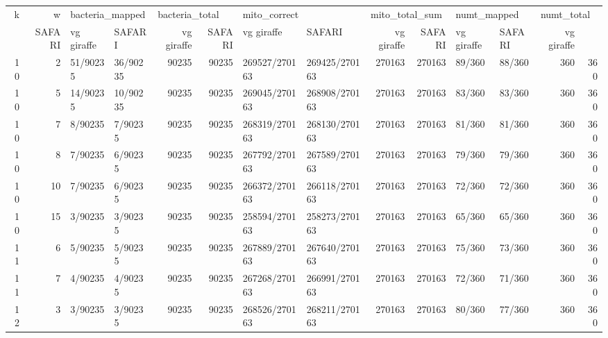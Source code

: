 \begin{tabular}{rrllrrllrrllrr}
\toprule
   k &    w & \multicolumn{2}{l}{bacteria_mapped} & \multicolumn{2}{l}{bacteria_total} & \multicolumn{2}{l}{mito_correct} & \multicolumn{2}{l}{mito_total_sum} & \multicolumn{2}{l}{numt_mapped} & \multicolumn{2}{l}{numt_total} \\
     &          SAFARI & vg giraffe &         SAFARI & vg giraffe &        SAFARI &    vg giraffe &         SAFARI & vg giraffe &      SAFARI & vg giraffe &     SAFARI & vg giraffe \\
\midrule
10 &  2 &        51/90235 &   36/90235 &          90235 &      90235 & 269527/270163 & 269425/270163 &         270163 &     270163 &      89/360 &     88/360 &        360 &        360 \\
10 &  5 &        14/90235 &   10/90235 &          90235 &      90235 & 269045/270163 & 268908/270163 &         270163 &     270163 &      83/360 &     83/360 &        360 &        360 \\
10 &  7 &         8/90235 &    7/90235 &          90235 &      90235 & 268319/270163 & 268130/270163 &         270163 &     270163 &      81/360 &     81/360 &        360 &        360 \\
10 &  8 &         7/90235 &    6/90235 &          90235 &      90235 & 267792/270163 & 267589/270163 &         270163 &     270163 &      79/360 &     79/360 &        360 &        360 \\
10 & 10 &         7/90235 &    6/90235 &          90235 &      90235 & 266372/270163 & 266118/270163 &         270163 &     270163 &      72/360 &     72/360 &        360 &        360 \\
10 & 15 &         3/90235 &    3/90235 &          90235 &      90235 & 258594/270163 & 258273/270163 &         270163 &     270163 &      65/360 &     65/360 &        360 &        360 \\
11 &  6 &         5/90235 &    5/90235 &          90235 &      90235 & 267889/270163 & 267640/270163 &         270163 &     270163 &      75/360 &     73/360 &        360 &        360 \\
11 &  7 &         4/90235 &    4/90235 &          90235 &      90235 & 267268/270163 & 266991/270163 &         270163 &     270163 &      72/360 &     71/360 &        360 &        360 \\
12 &  3 &         3/90235 &    3/90235 &          90235 &      90235 & 268526/270163 & 268211/270163 &         270163 &     270163 &      80/360 &     77/360 &        360 &        360 \\

\end{tabular}
